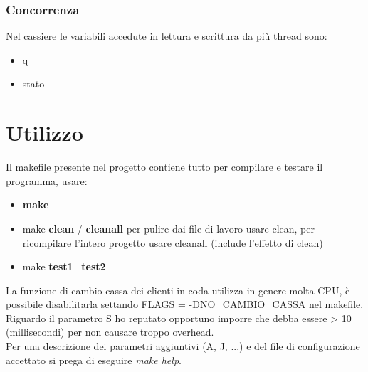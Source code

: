 \documentclass[11pt, a4paper]{article}
\begin{document}
\subsubsection{Concorrenza}
Nel cassiere le variabili accedute in lettura e scrittura da più thread sono:
\begin{itemize}
\item q
\item stato
\end{itemize}

\section{Utilizzo}
Il makefile presente nel progetto contiene tutto per compilare e testare il programma, usare:
\begin{itemize}
\item \textbf{make}
\item make \textbf{clean} / \textbf{cleanall} per pulire dai file di lavoro usare clean, per ricompilare l'intero progetto usare cleanall (include l'effetto di clean)
\item make \textbf{test1} \ \textbf{test2}
\end{itemize}
La funzione di cambio cassa dei clienti in coda utilizza in genere molta CPU, è possibile disabilitarla settando FLAGS = -DNO\_CAMBIO\_CASSA nel makefile.\\
Riguardo il parametro S ho reputato opportuno imporre che debba essere > 10 (millisecondi) per non causare troppo overhead.\\
Per una descrizione dei parametri aggiuntivi (A, J, ...) e del file di configurazione accettato si prega di eseguire \textit{make help}.
\end{document}

